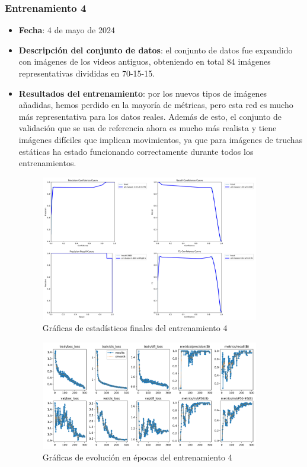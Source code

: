 \subsubsection*{Entrenamiento 4}
\label{train:4}
\begin{itemize}
    \item \textbf{Fecha}: 4 de mayo de 2024
    \item \textbf{Descripción del conjunto de datos}: el conjunto de datos fue expandido con imágenes de los videos antiguos, obteniendo en total 84 imágenes representativas divididas en 70-15-15.
    \item \textbf{Resultados del entrenamiento}: por los nuevos tipos de imágenes añadidas, hemos perdido en la mayoría de métricas, pero esta red es mucho más representativa para los datos reales. 
    Además de esto, el conjunto de validación que se usa de referencia ahora es mucho más realista y tiene imágenes difíciles que implican movimientos, ya que para imágenes de truchas estáticas ha 
    estado funcionando correctamente durante todos los entrenamientos.
    
    \begin{figure}[H]
        \centering
        \includegraphics[width=0.9\textwidth]{images/13/b/4/graficas2.png}
        \caption{Gráficas de estadísticos finales del entrenamiento 4}
        \label{fig:Estadisticos4}
    \end{figure}
    \begin{figure}[H]
        \centering
        \includegraphics[width=0.9\textwidth]{images/13/b/4/results.png}
        \caption{Gráficas de evolución en épocas del entrenamiento 4}
        \label{fig:Resultados4}
    \end{figure}

\end{itemize}

